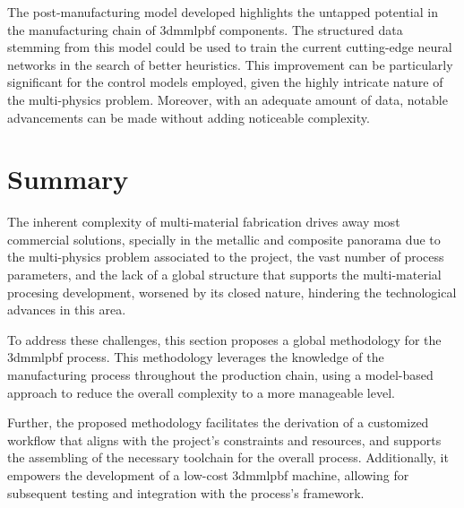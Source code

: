 The post-manufacturing model developed highlights the untapped potential in the
manufacturing chain of \gls{3dmmlpbf} components. The structured data stemming
from this model could be used to train the current cutting-edge neural networks in
the search of better heuristics.
This improvement can be particularly significant for the control models employed, given the highly intricate nature of the multi-physics problem. Moreover, with an adequate amount of data, notable advancements can be made without adding noticeable complexity.


\section{Summary}%
\label{sec:summary-prob}
The inherent complexity of multi-material fabrication drives away most
commercial solutions, specially in the metallic and composite panorama due to
the multi-physics problem associated to the project, the vast number of process
parameters, and the lack of a global structure that supports the multi-material
procesing development, worsened by its closed nature, hindering the
technological advances in this area.

To address these challenges, this section proposes a global methodology for the
\gls{3dmmlpbf} process. This methodology leverages the knowledge of the
manufacturing process throughout the production chain, using a model-based
approach to reduce the overall complexity to a more manageable level.

Further, the proposed methodology facilitates the derivation of a customized workflow that aligns with the project's constraints and resources, and supports the assembling of the necessary toolchain for the overall process. Additionally, it empowers the development of a low-cost \gls{3dmmlpbf} machine, allowing for subsequent testing and integration with the process's framework.
  
